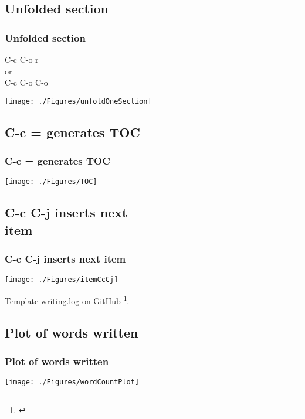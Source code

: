 \documentclass{beamer}
\begin{document}
\subsection{Unfolded section}
\begin{frame}
\frametitle{Unfolded section}
C-c C-o r \\
or \\
C-c C-o C-o \\
\begin{center}
    \texttt{[image: ./Figures/unfoldOneSection]}
\end{center}
\end{frame}


\subsection{C-c = generates TOC}
\begin{frame}
\frametitle{C-c = generates TOC}
\begin{center}
    \texttt{[image: ./Figures/TOC]}
\end{center}
\end{frame}
\note{}





\subsection{C-c C-j inserts next \\item}
\begin{frame}
\frametitle{C-c C-j inserts next item}
\begin{center}
    \texttt{[image: ./Figures/itemCcCj]}
\end{center}
Template writing.log on GitHub \footnote{\url{}}.
\end{frame}
\note{}


\subsection{Plot of words written}
\begin{frame}
\frametitle{Plot of words written}
\begin{center}
\begin{center}
    \texttt{[image: ./Figures/wordCountPlot]}
\end{center}
\end{center}
\end{frame}
\note{}
\end{document}
